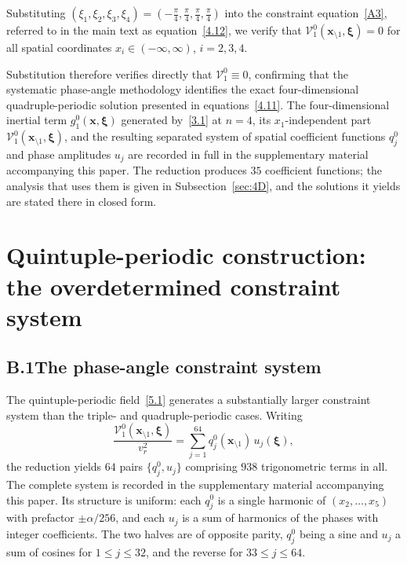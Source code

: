 \documentclass[11pt]{jfm}
\let\le=\leqslant  \let\leq=\leqslant
\numberwithin{equation}{section}
\begin{document}
Substituting $(\xi_1, \xi_2, \xi_3, \xi_4) = (-\frac{\pi}{4}, \frac{\pi}{4}, \frac{\pi}{4}, \frac{\pi}{4})$ into the constraint equation~\eqref{A3}, referred to in the main text as equation~\eqref{4.12}, we verify that $\mathcal{V}_1^0(\boldsymbol{x}_{\setminus 1}, \boldsymbol{\xi}) = 0$ for all spatial coordinates $x_i \in (-\infty, \infty)$, $i = 2, 3, 4$.

Substitution therefore verifies directly that $\mathcal{V}_1^0\equiv0$, confirming that the
systematic phase-angle methodology identifies the exact four-dimensional quadruple-periodic
solution presented in equations~\eqref{4.11}.
\else
The four-dimensional inertial term $g_1^0(\boldsymbol{x},\boldsymbol{\xi})$ generated
by~\eqref{3.1} at $n=4$, its $x_1$-independent part
$\mathcal{V}_1^0(\boldsymbol{x}_{\setminus 1},\boldsymbol{\xi})$, and the resulting separated
system of spatial coefficient functions $q_j^0$ and phase amplitudes $u_j$ are recorded in full in
the supplementary material accompanying this paper. The reduction produces $35$ coefficient
functions; the analysis that uses them is given in Subsection~\ref{sec:4D}, and the solutions it
yields are stated there in closed form.
\fi

\section{Quintuple-periodic construction: the overdetermined constraint system}
\label{app:5D}
\subsection*{B.1\quad The phase-angle constraint system}
The quintuple-periodic field~\eqref{5.1} generates a substantially larger constraint system than
the triple- and quadruple-periodic cases. Writing
\begin{equation} \label{B1}
\frac{\mathcal{V}_1^0(\boldsymbol{x}_{\setminus 1}, \boldsymbol{\xi})}{v_r^2}
= \sum_{j=1}^{64} q_j^0(\boldsymbol{x}_{\setminus 1})\, u_j(\boldsymbol{\xi}),
\end{equation}
the reduction yields $64$ pairs $\{q_j^0,u_j\}$ comprising $938$ trigonometric terms in all. The
complete system is recorded in the supplementary material accompanying this paper. Its structure is
uniform: each $q_j^0$ is a single harmonic of $(x_2,\dots,x_5)$ with prefactor $\pm\alpha/256$, and
each $u_j$ is a sum of harmonics of the phases with integer coefficients. The two halves are of
opposite parity, $q_j^0$ being a sine and $u_j$ a sum of cosines for $1\le j\le32$, and the reverse
for $33\le j\le64$.
\end{document}
